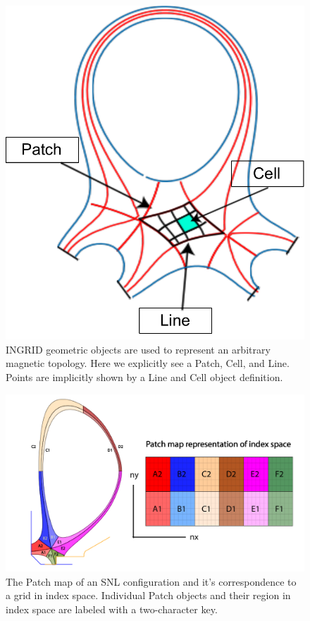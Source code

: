 \begin{figure}[H]
    \centering
    \includegraphics[width=0.35\linewidth]{figures/geometry_render.pdf}  %
    \caption{\label{fig:geo_collection} INGRID geometric objects are used to represent an arbitrary magnetic topology. Here we explicitly see a Patch, Cell, and Line. Points are implicitly shown by a Line and Cell object definition.}
\end{figure}

\begin{figure}[H]
    \centering
    \includegraphics[width=\linewidth]{figures/patch_index_space.pdf}
    \caption{The Patch map of an SNL configuration and it's correspondence to a grid in index space. Individual Patch objects and their region in index space are labeled with a two-character key.}
    \label{fig:snl_patch_index_space}
\end{figure}

